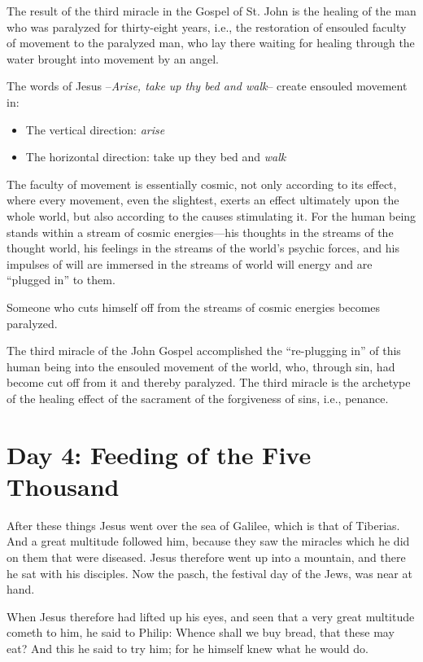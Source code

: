 The result of the third miracle in the Gospel of St. John is the healing of the man who was paralyzed for thirty-eight years, i.e., the restoration of ensouled faculty of movement to the paralyzed man, who lay there waiting for healing through the water brought into movement by an angel.

The words of Jesus --\textit{Arise, take up thy bed and walk}-- create ensouled movement in:

\begin{itemize}
\item The vertical direction: \emph{arise} 
\item The horizontal direction: take up they bed and \emph{walk} 
\end{itemize}
The faculty of movement is essentially cosmic, not only according to its effect, where every movement, even the slightest, exerts an effect ultimately upon the whole world, but also according to the causes stimulating it. For the human being stands within a stream of cosmic energies—his thoughts in the streams of the thought world, his feelings in the streams of the world's psychic forces, and his impulses of will are immersed in the streams of world will energy and are ``plugged in'' to them.

Someone who cuts himself off from the streams of cosmic energies becomes paralyzed.

\begin{quotex}
The third miracle of the John Gospel accomplished the ``re-plugging in'' of this human being into the ensouled movement of the world, who, through sin, had become cut off from it and thereby paralyzed. The third miracle is the archetype of the healing effect of the sacrament of the forgiveness of sins, i.e., penance.

\end{quotex}

\section{Day 4: Feeding of the Five Thousand}

After these things Jesus went over the sea of Galilee, which is that of Tiberias. And a great multitude followed him, because they saw the miracles which he did on them that were diseased. Jesus therefore went up into a mountain, and there he sat with his disciples. Now the pasch, the festival day of the Jews, was near at hand.

When Jesus therefore had lifted up his eyes, and seen that a very great multitude cometh to him, he said to Philip: Whence shall we buy bread, that these may eat? And this he said to try him; for he himself knew what he would do.

